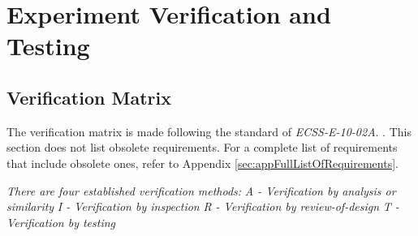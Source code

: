 \documentclass[a4paper,12pt,oneside]{article} %
\begin{document}
\raggedbottom
\raggedbottom
\pagebreak
\section{Experiment Verification and Testing}

\subsection{Verification Matrix}

The verification matrix is made following the standard of \textit{ECSS-E-10-02A}. \cite{ECSSSecretariat}. This section does not list obsolete requirements. For a complete list of requirements that include obsolete ones, refer to Appendix \ref{sec:appFullListOfRequirements}.

\textit{There are four established verification methods:}
\newline \textit{A - Verification by analysis or similarity}
\newline \textit{I - Verification by inspection}
\newline \textit{R - Verification by review-of-design}
\newline \textit{T - Verification by testing}

\makeatletter
\renewcommand\@makefntext[1]{\leftskip=3em\hskip-1em\@makefnmark#1}
\makeatother
\end{document}
